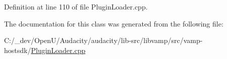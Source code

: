 Definition at line 110 of file Plugin\+Loader.\+cpp.



The documentation for this class was generated from the following file\+:\begin{DoxyCompactItemize}
\item 
C\+:/\+\_\+dev/\+Open\+U/\+Audacity/audacity/lib-\/src/libvamp/src/vamp-\/hostsdk/\hyperlink{_plugin_loader_8cpp}{Plugin\+Loader.\+cpp}\end{DoxyCompactItemize}
